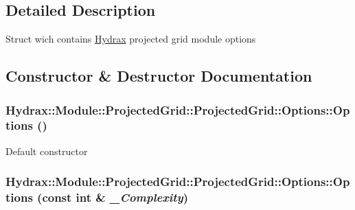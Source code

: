 \subsection{Detailed Description}
Struct wich contains \hyperlink{class_hydrax_1_1_hydrax}{Hydrax} projected grid module options 

\subsection{Constructor \& Destructor Documentation}
\hypertarget{struct_hydrax_1_1_module_1_1_projected_grid_1_1_options_18aba976dbc90be89d1d4bd464f8d877}{
\subsubsection[{Options}]{\setlength{\rightskip}{0pt plus 5cm}Hydrax::Module::ProjectedGrid::ProjectedGrid::Options::Options ()}}
\label{struct_hydrax_1_1_module_1_1_projected_grid_1_1_options_18aba976dbc90be89d1d4bd464f8d877}


Default constructor \hypertarget{struct_hydrax_1_1_module_1_1_projected_grid_1_1_options_1c68747eb19c420f6b85fc4806b7c341}{
\subsubsection[{Options}]{\setlength{\rightskip}{0pt plus 5cm}Hydrax::Module::ProjectedGrid::ProjectedGrid::Options::Options (const int \& {\em \_\-Complexity})}}
\label{struct_hydrax_1_1_module_1_1_projected_grid_1_1_options_1c68747eb19c420f6b85fc4806b7c341}


